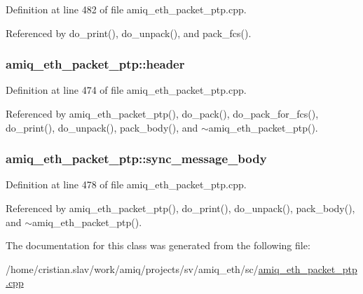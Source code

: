 Definition at line 482 of file amiq\_\-eth\_\-packet\_\-ptp.cpp.

Referenced by do\_\-print(), do\_\-unpack(), and pack\_\-fcs().\hypertarget{classamiq__eth__packet__ptp_a09df382a165bd23e508f402ff0833c36}{
\subsubsection[{header}]{ {\bf amiq\_\-eth\_\-packet\_\-ptp::header}}}
\label{classamiq__eth__packet__ptp_a09df382a165bd23e508f402ff0833c36}


Definition at line 474 of file amiq\_\-eth\_\-packet\_\-ptp.cpp.

Referenced by amiq\_\-eth\_\-packet\_\-ptp(), do\_\-pack(), do\_\-pack\_\-for\_\-fcs(), do\_\-print(), do\_\-unpack(), pack\_\-body(), and $\sim$amiq\_\-eth\_\-packet\_\-ptp().\hypertarget{classamiq__eth__packet__ptp_ad28ea57af5d6111b1724fb14e995d30c}{
\subsubsection[{sync\_\-message\_\-body}]{ {\bf amiq\_\-eth\_\-packet\_\-ptp::sync\_\-message\_\-body}}}
\label{classamiq__eth__packet__ptp_ad28ea57af5d6111b1724fb14e995d30c}


Definition at line 478 of file amiq\_\-eth\_\-packet\_\-ptp.cpp.

Referenced by amiq\_\-eth\_\-packet\_\-ptp(), do\_\-print(), do\_\-unpack(), pack\_\-body(), and $\sim$amiq\_\-eth\_\-packet\_\-ptp().

The documentation for this class was generated from the following file:\begin{DoxyCompactItemize}
\item 
/home/cristian.slav/work/amiq/projects/sv/amiq\_\-eth/sc/\hyperlink{amiq__eth__packet__ptp_8cpp}{amiq\_\-eth\_\-packet\_\-ptp.cpp}\end{DoxyCompactItemize}
